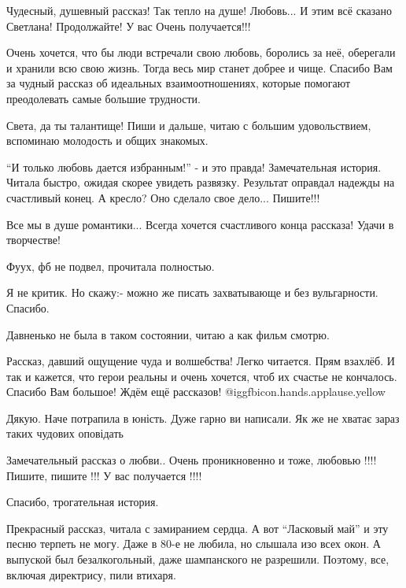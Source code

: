 \begin{itemize}

Чудесный, душевный рассказ! Так тепло на душе! Любовь... И этим всё сказано
Светлана! Продолжайте! У вас Очень получается!!!


Очень хочется, что бы люди встречали свою любовь, боролись за неё, оберегали и
хранили всю свою жизнь. Тогда весь мир станет добрее и чище. Спасибо Вам за
чудный рассказ об идеальных взаимоотношениях, которые помогают преодолевать
самые большие трудности.

Света, да ты талантище! Пиши и дальше, читаю с большим удовольствием, вспоминаю молодость и общих знакомых.


\enquote{И только любовь дается избранным!} - и это правда! Замечательная история.
Читала быстро, ожидая скорее увидеть развязку. Результат оправдал надежды на
счастливый конец. А кресло? Оно сделало свое дело... Пишите!!!

Все мы в душе романтики... Всегда хочется счастливого конца рассказа! Удачи в творчестве!


Фуух, фб не подвел, прочитала полностью.

Я не критик. Но скажу:- можно же писать захватывающе и без вульгарности.
Спасибо.

Давненько не была в таком состоянии, читаю а как фильм смотрю.


Рассказ, давший ощущение чуда и волшебства! Легко читается. Прям взахлёб. И так
и кажется, что герои реальны и очень хочется, чтоб их счастье не кончалось.
Спасибо Вам большое! Ждём ещё рассказов!  @igg{fbicon.hands.applause.yellow} 


Дякую. Наче потрапила в юність. Дуже гарно ви написали. Як же не хватає зараз таких чудових оповідать


Замечательный рассказ о любви.. Очень проникновенно и тоже, любовью !!!!
Пишите, пишите !!! У вас получается !!!!


Спасибо, трогательная история.


Прекрасный рассказ, читала с замиранием сердца. А вот \enquote{Ласковый май} и эту
песню терпеть не могу. Даже в 80-е не любила, но слышала изо всех окон. А
выпуской был безалкогольный, даже шампанского не разрешили. Поэтому, все,
включая директрису, пили втихаря.


\end{itemize}
